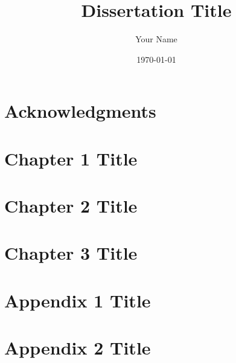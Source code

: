 



\title{Dissertation Title}
\author{Your Name}
\date{\today}
\maketitle

\begin{abstract}
    
\end{abstract}

\chapter*{Acknowledgments}


\tableofcontents
\newpage

\chapter{Chapter 1 Title}


\chapter{Chapter 2 Title}


\chapter{Chapter 3 Title}


\appendix
\chapter{Appendix 1 Title}


\chapter{Appendix 2 Title}


\newpage




